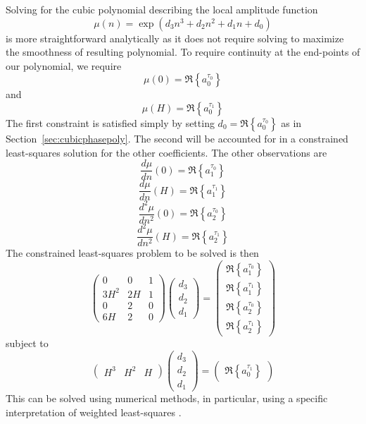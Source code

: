 Solving for the cubic polynomial describing the local amplitude function
\begin{equation}
    \mu(n) = \exp \left(d_3 n^{3} + d_2 n^{2} + d_1 n + d_0 \right)
\end{equation}
is more straightforward analytically as it does not require solving to maximize
the smoothness of resulting polynomial. To require continuity at the end-points
of our polynomial, we require
\[
    \mu(0) = \Re \left\{ a^{\tau_0}_0 \right\}
\]
and
\[
    \mu(H) = \Re \left\{ a^{\tau_1}_0 \right\}
\]
The first constraint is satisfied simply by setting $d_0 = \Re \left\{
a^{\tau_0}_0 \right\}$ as in Section~\ref{sec:cubicphasepoly}. The second will be
accounted for in a constrained least-squares solution for the other
coefficients. The other observations are
\[
    \frac{d \mu}{dn} (0) = \Re \left\{ a^{\tau_0}_1 \right\}
\]
\[
    \frac{d \mu}{dn} (H) = \Re \left\{ a^{\tau_1}_1 \right\}
\]
\[
    \frac{d^2 \mu}{dn^2} (0) = \Re \left\{ a^{\tau_0}_2 \right\}
\]
\[
    \frac{d^2 \mu}{dn^2} (H) = \Re \left\{ a^{\tau_1}_2 \right\}
\]
The constrained least-squares problem to be solved is then
\begin{equation}
    \begin{pmatrix}
        0 & 0 & 1 \\
        3 H^2 & 2 H & 1 \\
        0 & 2 & 0 \\
        6 H & 2 & 0
    \end{pmatrix}
    \begin{pmatrix}
        d_3 \\
        d_2 \\
        d_1
    \end{pmatrix}
    =
    \begin{pmatrix}
        \Re \left\{ a^{\tau_0}_1 \right\} \\
        \Re \left\{ a^{\tau_1}_1 \right\} \\
        \Re \left\{ a^{\tau_0}_2 \right\} \\
        \Re \left\{ a^{\tau_1}_2 \right\}
    \end{pmatrix}
\end{equation}
subject to
\[
    \begin{pmatrix}
        H^3 & H^2 & H
    \end{pmatrix}
    \begin{pmatrix}
        d_3 \\
        d_2 \\
        d_1
    \end{pmatrix}
    =
    \begin{pmatrix}
        \Re \left\{ a^{\tau_1}_0 \right\}
    \end{pmatrix}
\]
This can be solved using numerical methods, in particular, using a specific
interpretation of weighted least-squares \cite[p.~266]{golub1996matrix}.

